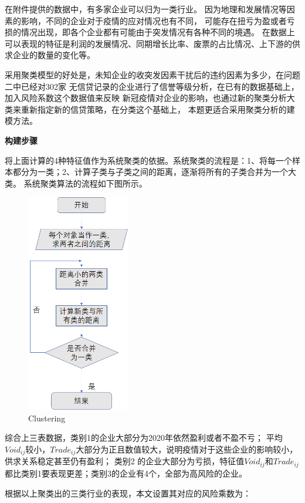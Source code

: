 \documentclass[UTF8]{ctexart}
\begin{document}
		在附件提供的数据中，有多家企业可以归为一类行业。
		因为地理和发展情况等因素的影响，不同的企业对于疫情的应对情况也有不同，
		可能存在扭亏为盈或者亏损的情况出现，即各个企业都有可能由于突发情况有各种不同的境遇。
		在数据上可以表现的特征是利润的发展情况、同期增长比率、废票的占比情况、上下游的供求企业的数量的变化等。
		
		采用聚类模型的好处是，未知企业的收突发因素干扰后的违约因素为多少，在问题二中已经对302家
		无信贷记录的企业进行了信誉等级分析，在已有的数据基础上，加入风险系数这个数据值来反映
		新冠疫情对企业的影响，也通过新的聚类分析大类来重新指定新的信贷策略，在分类这个基础上，
		本题更适合采用聚类分析的建模方法。
		
		\textbf{构建步骤}
		
		将上面计算的4种特征值作为系统聚类的依据。系统聚类的流程是：1、将每一个样本都分为一类；2、计算子类与子类之间的距离，逐渐将所有的子类合并为一个大类。
		系统聚类算法的流程如下图所示。
		\begin{figure}[H]\centering
			\includegraphics[width=0.4\textwidth,height=0.72\textwidth]{img/Clustering.png} %
			\caption{Clustering}
			\label{fig:figure 2} %
			\end{figure}
		
		
		
		综合上三表数据，类别1的企业大部分为2020年依然盈利或者不盈不亏；
		平均$Void_{ij}$较小，$Trade_{ij}$大部分为正且数值较大，说明疫情对于这些企业的影响较小，供求关系稳定甚至仍有盈利；
		类别2 的企业大部分为亏损，特征值$Void_{ij}$和$Trade_{ij}$都比类别1要表现更差；类别3的企业有4个，全部为高风险的企业。
		
		根据以上聚类出的三类行业的表现，本文设置其对应的风险乘数为：
		
\end{document}
